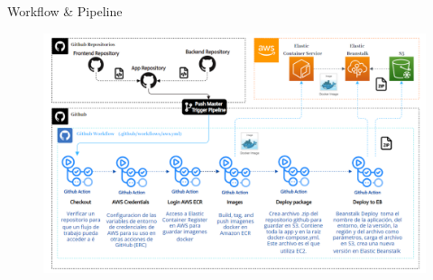 \documentclass[xcolor=pdftex,dvipsnames,table]{beamer}
\begin{document}
\begin{frame}{Workflow & Pipeline}
        \begin{figure}
            \centering
            \includegraphics[width=1\linewidth]{pipeline/pipeline2.png}
            \label{fig:my_label}
        \end{figure}
\end{frame}

\end{document}
